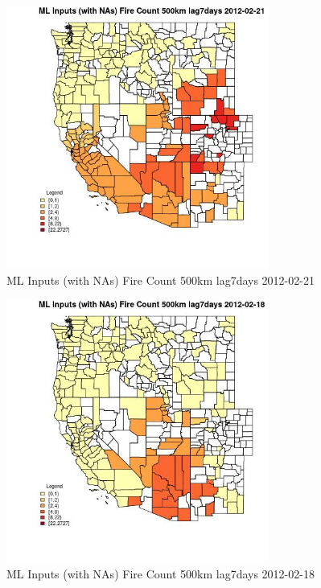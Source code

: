 \begin{figure} 
\centering  
\includegraphics[width=0.77\textwidth]{Code_Outputs/Report_ML_input_PM25_Step4_part_f_de_duplicated_aves_prioritize_24hr_obswNAs_CountyFire_Count_500km_lag7daysMean2012-02-21.jpg} 
\caption{\label{fig:Report_ML_input_PM25_Step4_part_f_de_duplicated_aves_prioritize_24hr_obswNAsCountyFire_Count_500km_lag7daysMean2012-02-21}ML Inputs (with NAs) Fire Count 500km lag7days 2012-02-21} 
\end{figure} 
 

\begin{figure} 
\centering  
\includegraphics[width=0.77\textwidth]{Code_Outputs/Report_ML_input_PM25_Step4_part_f_de_duplicated_aves_prioritize_24hr_obswNAs_CountyFire_Count_500km_lag7daysMean2012-02-18.jpg} 
\caption{\label{fig:Report_ML_input_PM25_Step4_part_f_de_duplicated_aves_prioritize_24hr_obswNAsCountyFire_Count_500km_lag7daysMean2012-02-18}ML Inputs (with NAs) Fire Count 500km lag7days 2012-02-18} 
\end{figure} 
 

